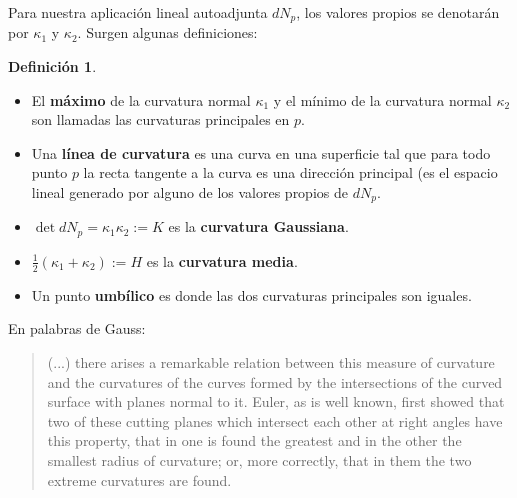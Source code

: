 \documentclass[spanish]{book}
\theoremstyle{definition}
\newtheorem*{defn}{Definición}
\begin{document}
Para nuestra aplicación lineal autoadjunta $dN_p$, los valores propios se denotarán por $\kappa_1$ y $\kappa_2$. Surgen algunas definiciones:

\begin{defn}\leavevmode
	\begin{itemize}
		\item El \textbf{máximo} de la curvatura normal $\kappa_1$ y el mínimo de la curvatura normal $\kappa_2$ son llamadas las curvaturas principales en $p$.
		\item Una \textbf{línea de curvatura} es una curva en una superficie tal que para todo punto $p$ la recta tangente a la curva es una dirección principal (es el espacio lineal generado por alguno de los valores propios de $dN_p$.
		\item $\det{dN_p}=\kappa_1\kappa_2:=K$ es la \textbf{curvatura Gaussiana}.
		\item $\frac{1}{2}(\kappa_1+\kappa_2):=H$ es la \textbf{curvatura media}.
		\item Un punto \textbf{umbílico} es donde las dos curvaturas principales son iguales.
	\end{itemize}
\end{defn}
En palabras de Gauss:
\begin{quotation}
	(...) there arises a remarkable relation between this measure of curvature and the curvatures of the curves formed by the intersections of the curved surface with planes normal to it. Euler, as is well known, first showed that two of these cutting planes which intersect each other at right angles have this property, that in one is found the greatest and in the other the smallest radius of curvature; or, more correctly, that in them the two extreme curvatures are found.
\end{quotation}
\end{document}
